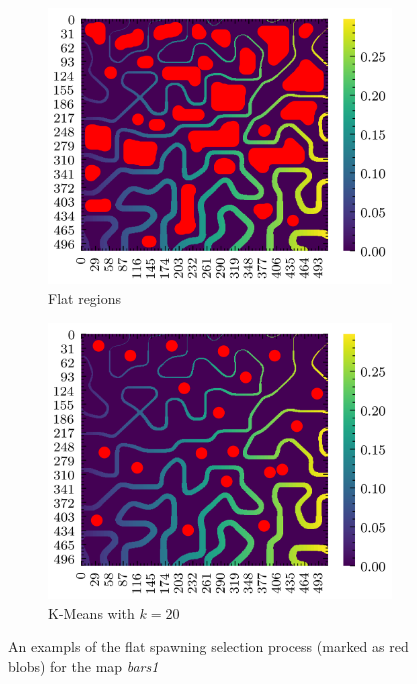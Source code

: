 \documentclass[../document.tex]{subfiles}
\begin{document}
\begin{figure}[htbp]
    \begin{subfigure}[b]{0.45\textwidth}
        \includegraphics[width=\textwidth]{../img/3/spawn/flat-spawn-10.png}
        \caption{Flat regions}
    \end{subfigure}
    \begin{subfigure}[b]{0.45\textwidth}
        \includegraphics[width=\textwidth]{../img/3/spawn/spawn-10.png}
        \caption{K-Means with $k=20$}
    \end{subfigure}  
\label{fig : spawn-strat}
\caption{An exampls of the flat spawning selection process (marked as red blobs) for the map \emph{bars1} }   
\end{figure}
\end{document}
